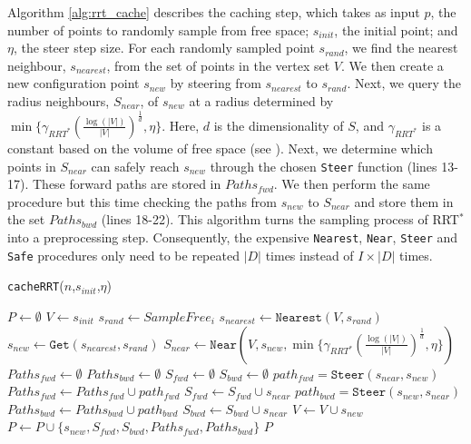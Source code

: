 \documentclass[letterpaper, 10 pt, conference]{ieeeconf}
\begin{document}
Algorithm \ref{alg:rrt_cache} describes the caching step, which takes as input $p$, the number of points to randomly sample from free space; $s_{init}$, the initial point; and $\eta$, the steer step size. For each randomly sampled point $s_{rand}$, we find the nearest neighbour, $s_{nearest}$, from the set of points in the vertex set $V$. We then create a new configuration point $s_{new}$ by steering from $s_{nearest}$ to $s_{rand}$. Next, we query the radius neighbours, $S_{near}$, of $s_{new}$ at a radius determined by  $\min\{\gamma_{RRT^*}(\frac{\log(|V|)}{|V|})^{\frac{1}{d}},\eta\}$. Here, $d$ is the dimensionality of $S$, and $\gamma_{RRT^*}$ is a constant based on the volume of free space (see \cite{karaman2011sampling}).  Next, we determine which points in $S_{near}$ can safely reach $s_{new}$ through the chosen \texttt{Steer} function (lines 13-17). These forward paths are stored in $Paths_{fwd}$. We then perform the same procedure but this time checking the paths from $s_{new}$ to $S_{near}$ and store them in the set $Paths_{bwd}$ (lines 18-22). This algorithm turns the sampling process of RRT$^*$  into a preprocessing step. Consequently, the expensive \texttt{Nearest}, \texttt{Near}, \texttt{Steer} and \texttt{Safe} procedures only need to be repeated $|D|$ times instead of $I\times|D|$ times.


	\begin{algorithm}

 	\scriptsize
	\caption{\small \texttt{cacheRRT}($n$,$s_{init}$,$\eta$)}
	\label{alg:rrt_cache}
	\begin{algorithmic}[1]
	\STATE $P \gets \emptyset$ \hfill {}
	\STATE $V \gets {s_{init}}$
	\STATE $s_{rand} \gets SampleFree_i$
	\STATE $s_{nearest} \gets \texttt{Nearest}(V,s_{rand})$
	\STATE $s_{new} \gets \texttt{Get}(s_{nearest},s_{rand})$
	\STATE $S_{near} \gets \texttt{Near}(V,{s_{new}},\min\{\gamma_{RRT^*}(\frac{\log(|V|)}{|V|})^{\frac{1}{d}},\eta\})$
	\STATE $Paths_{fwd} \gets \emptyset$
	\STATE $Paths_{bwd} \gets \emptyset$
	\STATE $S_{fwd} \gets \emptyset$
	\STATE $S_{bwd} \gets \emptyset$
	\STATE $path_{fwd} = \texttt{Steer}(s_{near},s_{new})$
	\STATE $Paths_{fwd} \gets Paths_{fwd} \cup path_{fwd}$
	\STATE $S_{fwd} \gets S_{fwd} \cup s_{near}$
	\ENDIF
	\STATE $path_{bwd} = \texttt{Steer}(s_{new},s_{near})$
	\STATE $Paths_{bwd} \gets Paths_{bwd} \cup path_{bwd}$
	\STATE $S_{bwd} \gets S_{bwd} \cup s_{near}$
	\ENDIF
	\ENDFOR
	\STATE $V\gets V \cup s_{new}$
	\STATE $P \gets P \cup \{s_{new},S_{fwd},S_{bwd},Paths_{fwd},Paths_{bwd}\}$
	\ENDFOR
	\RETURN $P$
	\end{algorithmic}

	\end{algorithm}
\end{document}
